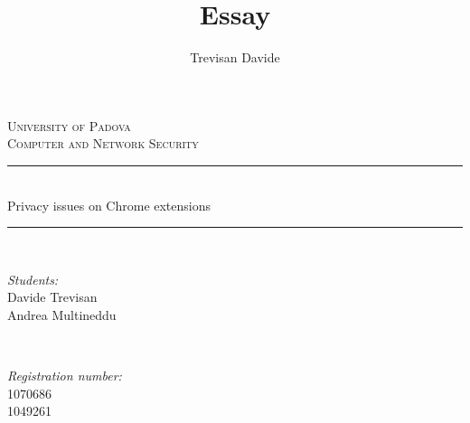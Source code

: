\documentclass[12pt]{article}
\title{Essay}
\date{}
\author{Trevisan Davide}
\begin{document}
		
		
		
		\begin{titlepage}
			
			\newcommand{\HRule}{\rule{\linewidth}{0.5mm}} %
			
			\center %
			
			
			\textsc{\LARGE University of Padova}\\[1.5cm] %
			\textsc{\Large Computer and Network Security}\\[0.5cm] %
			
			
			\HRule \\[0.4cm]
			{ \huge Privacy issues on Chrome extensions}\\[0.3cm]
			\HRule \\[1.5cm]
			
			
			\begin{minipage}{0.4\textwidth}
				\begin{flushleft} \large
					\emph{Students:}\\
					Davide Trevisan\\ %
					Andrea Multineddu\\
				\end{flushleft}
			\end{minipage}
			~
			\begin{minipage}{0.4\textwidth}
				\begin{flushright}\large
					\emph{Registration number:} \\
					\textsc{1070686}\\ %
					\textsc{1049261}\\
				\end{flushright}
			\end{minipage}\\[1cm]
			

\end{titlepage}
\end{document}
